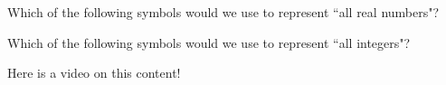 \documentclass{ximera}
\begin{document}
    \begin{problem}
        Which of the following symbols would we use to represent ``all real numbers"?
        \begin{multipleChoice}
        \end{multipleChoice}
    \end{problem}

    \begin{problem}
        Which of the following symbols would we use to represent ``all integers"?
        \begin{multipleChoice}
        \end{multipleChoice}
    \end{problem}

Here is a video on this content!

\end{document}
